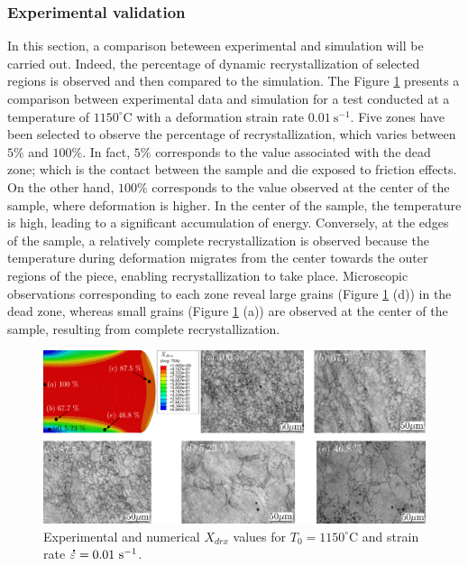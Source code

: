 \documentclass[metals,article,submit,pdftex,moreauthors]{Definitions/mdpi}
\DeclareRobustCommand{\mdot}[1]{\accentset{\mbox{\bfseries .}}{#1}}
\begin{document}
\subsubsection{Experimental validation \label{subsec:ExpValid}}
In this section, a comparison beteween experimental and simulation will be carried out.
Indeed, the percentage of dynamic recrystallization of selected regions is observed and then compared to the simulation.
The Figure \ref{fig:expNumDRX} presents a comparison between experimental data and simulation for a test conducted at a temperature of $1150^\circ$C with a deformation strain rate $0.01~\text{s}^{-1}$.
Five zones have been selected to observe the percentage of recrystallization, which varies between $5\%$ and $100\%$.
In fact, $5\%$ corresponds to the value associated with the dead zone; which is the contact between the sample and die exposed to friction effects.
On the other hand, $100\%$ corresponds to the value observed at the center of the sample, where deformation is higher.
In the center of the sample, the temperature is high, leading to a significant accumulation of energy.
Conversely, at the edges of the sample, a relatively complete recrystallization is observed because the temperature during deformation migrates from the center towards the outer regions of the piece, enabling recrystallization to take place.
Microscopic observations corresponding to each zone reveal large grains (Figure \ref{fig:expNumDRX} (d)) in the dead zone, whereas small grains (Figure \ref{fig:expNumDRX} (a)) are observed at the center of the sample, resulting from complete recrystallization.
\begin{figure}[H]
\includegraphics[width=0.98\columnwidth]{Figures/expNumDRX}
\caption{Experimental and numerical $X_{drx}$ values for $T_0=1150^\circ$C and strain rate $\mdot{\varepsilon}=0.01~\text{s}^{-1}$.}
\label{fig:expNumDRX}
\end{figure}
\end{document}
